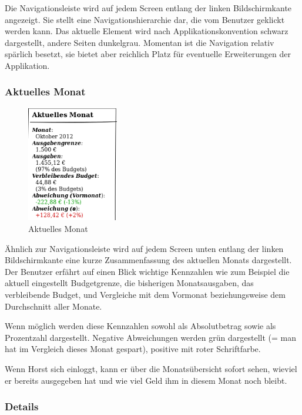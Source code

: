 Die Navigationsleiste wird auf jedem Screen entlang der linken Bildschirmkante
angezeigt. Sie stellt eine Navigationshierarchie dar, die vom Benutzer geklickt
werden kann. Das aktuelle Element wird nach Applikationskonvention schwarz
dargestellt, andere Seiten dunkelgrau.  Momentan ist die Navigation relativ
spärlich besetzt, sie bietet aber reichlich Platz für eventuelle Erweiterungen
der Applikation.

\subsubsection{Aktuelles Monat} \label{subsubsection:aktuelles_monat}

\begin{figure}[htl]
\centering
\includegraphics[width=4cm]{img/web_current_month}
\caption{Aktuelles Monat}
\label{fig:web_current_month}
\end{figure}

\"Ahnlich zur Navigationsleiste wird auf jedem Screen unten entlang der linken
Bildschirmkante eine kurze Zusammenfassung des aktuellen Monats dargestellt.
Der Benutzer erfährt auf einen Blick wichtige Kennzahlen wie zum Beispiel die
aktuell eingestellt Budgetgrenze, die bisherigen Monatsausgaben, das
verbleibende Budget, und Vergleiche mit dem Vormonat beziehungsweise dem
Durchschnitt aller Monate.

Wenn möglich werden diese Kennzahlen sowohl als Absolutbetrag sowie als
Prozentzahl dargestellt. Negative Abweichungen werden grün dargestellt (= man
hat im Vergleich dieses Monat gespart), positive mit roter Schriftfarbe.

Wenn Horst sich einloggt, kann er über die Monats\"ubersicht sofort sehen,
wieviel er bereits ausgegeben hat und wie viel Geld ihm in diesem Monat noch
bleibt.

\subsubsection{Details}

